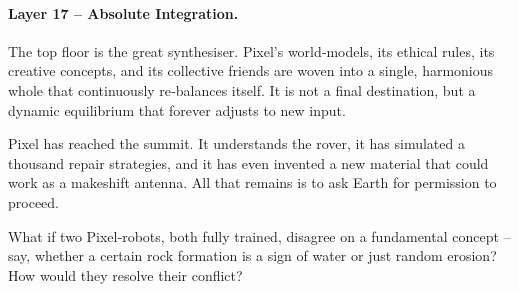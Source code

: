 \paragraph{Layer 17 – Absolute Integration.}
The top floor is the great synthesiser.  Pixel’s world‑models,
its ethical rules, its creative concepts, and its collective
friends are woven into a single, harmonious whole that continuously
re‑balances itself.  It is not a final destination, but a dynamic
equilibrium that forever adjusts to new input.

\begin{tcolorbox}[colback=black!3, colframe=black!40, title=\textbf{Mission Log – End of Cluster IV}]
Pixel has reached the summit.  It understands the rover, it has
simulated a thousand repair strategies, and it has even invented a
new material that could work as a makeshift antenna.  All that
remains is to ask Earth for permission to proceed.
\end{tcolorbox}

\begin{tcolorbox}[colback=orange!5, colframe=orange!60, title=\textbf{What if...?}]
What if two Pixel‑robots, both fully trained, disagree on a
fundamental concept – say, whether a certain rock formation is a
sign of water or just random erosion?  How would they resolve
their conflict?
\end{tcolorbox}

